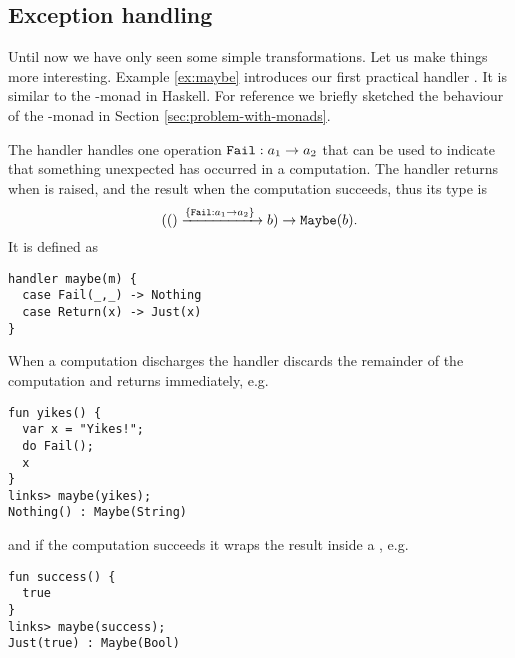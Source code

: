 \subsection{Exception handling}\label{sec:maybehandler}
Until now we have only seen some simple transformations. Let us make things more interesting.
Example \ref{ex:maybe} introduces our first practical handler . It is similar to the -monad in Haskell. For reference we briefly sketched the behaviour of the -monad in Section \ref{sec:problem-with-monads}.
\begin{example}\label{ex:maybe}
The  handler handles one operation $\texttt{Fail} : a_1 \to a_2$ that can be used to indicate that something unexpected has occurred in a computation. The handler returns  when  is raised, and  the result when the computation succeeds, thus its type is
\[ (() \xrightarrow{\left\{\texttt{Fail} : a_1 \to a_2 \right\}\;} b) \to \texttt{Maybe}(b). \]
It is defined as
\begin{lstlisting}[style=links]
handler maybe(m) {
  case Fail(_,_) -> Nothing
  case Return(x) -> Just(x)
}
\end{lstlisting}
When a computation discharges  the handler discards the remainder of the computation and returns  immediately, e.g.
\begin{lstlisting}[style=links]
fun yikes() { 
  var x = "Yikes!";
  do Fail();
  x
}
links> maybe(yikes);
Nothing() : Maybe(String)
\end{lstlisting}
and if the computation succeeds it wraps the result inside a , e.g.
\begin{lstlisting}[style=links]
fun success() {
  true
}
links> maybe(success);
Just(true) : Maybe(Bool)
\end{lstlisting}
\end{example}
